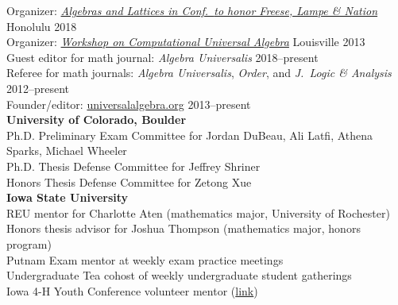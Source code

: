     \newcommand{\mytab}{\phantom{\textsl{Activities: }}}
    \renewcommand{\mytab}{\phantom{XX}}
    Organizer: \href{https://universalalgebra.github.io/ALH-2018/}
    {\emph{Algebras and Lattices in \Hawaii Conf.~{\small to honor Freese, Lampe \& Nation}}} \hfill  Honolulu 2018
    \\
    Organizer: \href{http://universalalgebra.wordpress.com/meetings/2013-workshop-on-computational-universal-algebra/}
    {\emph{Workshop on Computational Universal Algebra}} \hfill  Louisville 2013
    \\
    Guest editor for math journal: {\it Algebra Universalis} \hfill 2018--present
    \\
    Referee for math journals: {\it Algebra Universalis}, {\it Order}, and {\it J.~Logic \& Analysis} \hfill 2012--present
    \\
    Founder/editor: \href{http://universalalgebra.org}{universalalgebra.org}    \hfill 2013--present
    \\[6pt]
    \textbf{University of Colorado, Boulder} \\ %
    Ph.D. Preliminary Exam Committee for Jordan DuBeau, Ali Latfi, Athena Sparks, Michael Wheeler\\
    Ph.D. Thesis Defense Committee for Jeffrey Shriner\\
    Honors Thesis Defense Committee for Zetong Xue
    \\[6pt]
    \textbf{Iowa State University} \\ %
       REU mentor for Charlotte Aten (mathematics major, University of Rochester)\\
       Honors thesis advisor for Joshua Thompson (mathematics major, honors program)\\
       Putnam Exam mentor at weekly exam practice meetings\\
       Undergraduate Tea cohost of weekly undergraduate student gatherings\\
       Iowa 4-H Youth Conference volunteer mentor
    (\href{https://math.iastate.edu/2015/10/28/4-h-dared-to-discover-the-math-of-juggling/}{link})\\[6pt]
